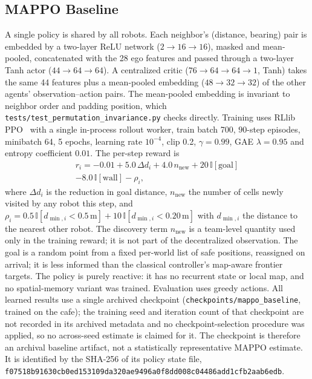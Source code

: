 \documentclass[conference]{IEEEtran}
\newcommand{\si}[1]{\mathrm{#1}}
\begin{document}
\subsection{MAPPO Baseline}
A single policy is shared by all robots. Each neighbor's (distance, bearing)
pair is embedded by a two-layer ReLU network ($2\to16\to16$), masked and
mean-pooled, concatenated with the 28 ego features and passed through a
two-layer Tanh actor ($44\to64\to64$). A centralized critic ($76\to64\to64\to1$,
Tanh) takes the same 44 features plus a mean-pooled embedding
($48\to32\to32$) of the other agents' observation--action pairs. The
mean-pooled embedding is invariant to neighbor order and padding position, which
\texttt{tests/test\_permutation\_invariance.py} checks directly. Training uses
RLlib PPO~\cite{schulman2017ppo} with a single in-process rollout worker,
train batch 700, $90$-step episodes, minibatch 64, 5 epochs, learning rate
$10^{-4}$, clip 0.2, $\gamma=0.99$, GAE $\lambda=0.95$ and entropy
coefficient $0.01$. The per-step reward is
\begin{multline}
r_i=-0.01+5.0\,\Delta d_i+4.0\,n_{\text{new}}+20\,\mathbb{I}[\text{goal}]\\
-8.0\,\mathbb{I}[\text{wall}]-\rho_i,
\end{multline}
where $\Delta d_i$ is the reduction in goal distance, $n_{\text{new}}$ the number
of cells newly visited by any robot this step, and $\rho_i=0.5\,\mathbb{I}[d_{\min,i}<0.5\,\si{m}]+10\,\mathbb{I}[d_{\min,i}<0.20\,\si{m}]$ with $d_{\min,i}$ the distance to the nearest other robot. The discovery term $n_{\text{new}}$ is a team-level quantity used only in the training reward; it is not part of the decentralized observation. The goal is a random
point from a fixed per-world list of safe positions, reassigned on arrival; it
is less informed than the classical controller's map-aware frontier targets. The policy is purely reactive: it has no recurrent state or local map, and no spatial-memory variant was trained.
Evaluation uses greedy actions. All learned results use a single archived checkpoint (\texttt{checkpoints/mappo\_baseline}, trained on the cafe); the training seed and iteration count of that checkpoint are not recorded in its archived metadata and no checkpoint-selection procedure was applied, so no across-seed estimate is claimed for it. The checkpoint is therefore an archival baseline artifact, not a statistically representative MAPPO estimate. It is identified by the SHA-256 of its policy state file, \texttt{f07518b9\allowbreak 1630cb0e\allowbreak d153109d\allowbreak a320ae94\allowbreak 96a0f8dd\allowbreak 008c0448\allowbreak 6add1cfb\allowbreak 2aab6edb}. 
\end{document}
